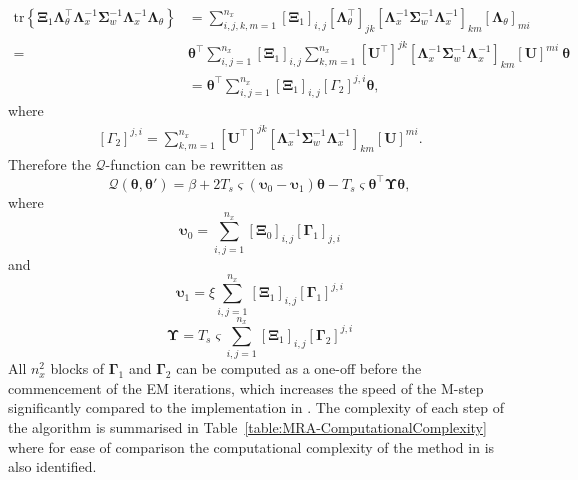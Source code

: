 \documentclass[11pt,draftcls,onecolumn,peerreview]{IEEEtran}
\begin{document}
\begin{align}
\mathrm{tr} \left\lbrace \boldsymbol\Xi_1 \boldsymbol\Lambda_{\theta}^\top\boldsymbol\Lambda_x^{-1}\boldsymbol\Sigma_w^{-1}\boldsymbol\Lambda_x^{-1}\boldsymbol\Lambda_{\theta}\right\rbrace&=\sum_{i,j,k,m=1}^{n_x}\left[\boldsymbol\Xi_1\right] _{i,j}[\boldsymbol\Lambda_{\theta}^{\top}]_{jk} \left[\boldsymbol\Lambda_x^{-1}\boldsymbol\Sigma_w^{-1}\boldsymbol\Lambda_x^{-1} \right]_{km}[\boldsymbol\Lambda_{\theta}]_{mi} \nonumber \\
=&\boldsymbol\theta^\top\sum_{i,j=1}^{n_x}\left[\boldsymbol\Xi_1\right] _{i,j}\sum_{k,m=1}^{n_x}[\mathbf U^{\top}]^{jk} \left[\boldsymbol\Lambda_x^{-1}\boldsymbol\Sigma_w^{-1}\boldsymbol\Lambda_x^{-1} \right]_{km}[\mathbf U]^{mi}~\boldsymbol\theta \nonumber \\
&=\boldsymbol\theta^\top\sum_{i,j=1}^{n_x}\left[\boldsymbol\Xi_1\right] _{i,j}\left[ \Gamma_2\right] ^{j,i}\boldsymbol\theta,
\end{align}
where
\begin{align}
\left[ \Gamma_2\right] ^{j,i}=\sum_{k,m=1}^{n_x}[\mathbf U^{\top}]^{jk} \left[\boldsymbol\Lambda_x^{-1}\boldsymbol\Sigma_w^{-1}\boldsymbol\Lambda_x^{-1} \right]_{km}[\mathbf U]^{mi}.
\end{align}
Therefore the $\mathcal Q$-function can be rewritten as
\begin{equation}\label{eq:MRA-QCompact}
\mathcal Q\left(\boldsymbol \theta,\boldsymbol\theta'\right)=\beta+2T_s\varsigma\left(\boldsymbol\upsilon_0-\boldsymbol\upsilon_1\right)\boldsymbol\theta-T_s\varsigma\boldsymbol\theta^\top\boldsymbol\Upsilon\boldsymbol\theta,
\end{equation}
where
\begin{equation}\label{eq:epsilon0}
\boldsymbol\upsilon_0=\sum_{i,j=1}^{n_x}[\boldsymbol\Xi_0]_{i,j}[\boldsymbol\Gamma_1]_{j,i}
\end{equation}
and
\begin{equation}\label{eq:epsilon1}
\boldsymbol\upsilon_1=\xi\sum_{i,j=1}^{n_x}[\boldsymbol\Xi_1]_{i,j}[\boldsymbol\Gamma_1]^{j,i}
\end{equation}
\begin{equation}\label{eq:Epsilon}
\boldsymbol\Upsilon=T_s\varsigma\sum_{i,j=1}^{n_x}[\boldsymbol\Xi_1]_{i,j}[\boldsymbol\Gamma_2]^{j,i}
\end{equation}
All $n_x^2$ blocks of $\boldsymbol\Gamma_1$ and $\boldsymbol\Gamma_2$  can be computed as a one-off before the commencement of the EM iterations, which increases the speed of the M-step significantly compared to the implementation in \cite{Dewar2009}. The complexity of each step of the algorithm is summarised in Table~\ref{table:MRA-ComputationalComplexity} where for ease of comparison the computational complexity of the method in \cite{Dewar2009} is also identified.
\end{document}
